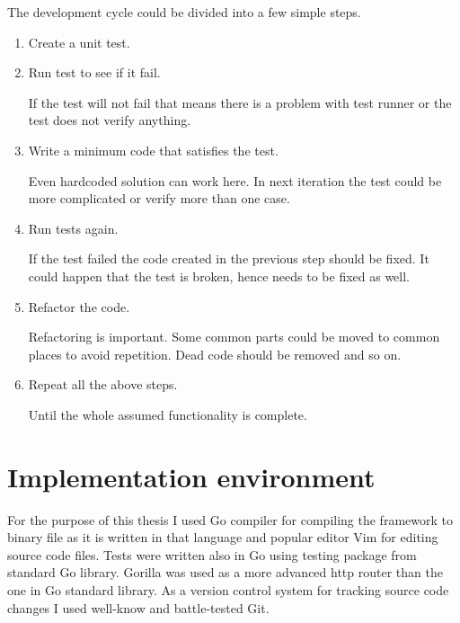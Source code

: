 The development cycle could be divided into a few simple steps.
\begin{enumerate}
    \item Create a unit test.
    \item Run test to see if it fail.

        If the test will not fail that means there is a problem with test runner or the test does not verify anything.
    \item Write a minimum code that satisfies the test.

        Even hardcoded solution can work here. In next iteration the test could be more complicated or verify more than one case.
    \item Run tests again.

        If the test failed the code created in the previous step should be fixed. It could happen that the test is broken, hence needs to be fixed as well.
    \item Refactor the code.

        Refactoring is important. Some common parts could be moved to common places to avoid repetition. Dead code should be removed and so on.
    \item Repeat all the above steps.

        Until the whole assumed functionality is complete.
\end{enumerate}


\section{Implementation environment}
For the purpose of this thesis I used Go compiler for compiling the framework to binary file as it is written in that language and popular editor Vim for editing source code files. Tests were written also in Go using testing package from standard Go library. Gorilla was used as a more advanced http router than the one in Go standard library. As a version control system for tracking source code changes I used well-know and battle-tested Git.
